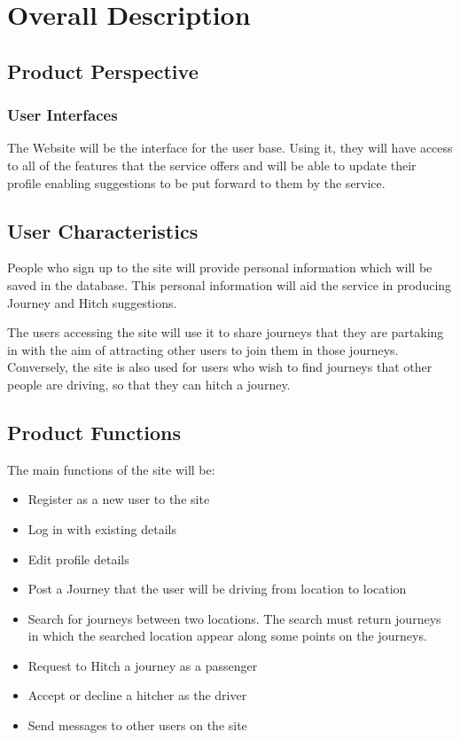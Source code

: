 \documentclass[11pt]{article}
\begin{document}
\section{Overall Description}
\subsection{Product Perspective}
\subsubsection{User Interfaces}
The Website will be the interface for the user base. Using it, they will have access to all of the features that the service offers and will be able to update their profile enabling suggestions to be put forward to them by the service.

\subsection{User Characteristics}
People who sign up to the site will provide personal information which will be saved in the database. This personal information will aid the service in producing Journey and Hitch suggestions. 

The users accessing the site will use it to share journeys that they are partaking in with the aim of attracting other users to join them in those journeys. Conversely, the site is also used for users who wish to find journeys that other people are driving, so that they can hitch a journey.

\subsection{Product Functions}
The main functions of the site will be:
\begin{itemize}
\item Register as a new user to the site
\item Log in with existing details
\item Edit profile details
\item Post a Journey that the user will be driving from location to location
\item Search for journeys between two locations. The search must return journeys in which the searched location appear along some points on the journeys.
\item Request to Hitch a journey as a passenger
\item Accept or decline a hitcher as the driver
\item Send messages to other users on the site
\end{itemize}
\end{document}

